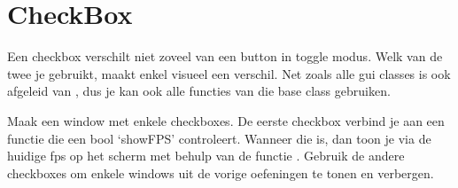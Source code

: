 \chapter{CheckBox}
Een checkbox verschilt niet zoveel van een button in toggle modus. Welk van de twee je gebruikt, maakt enkel visueel een verschil. Net zoals alle gui classes is ook  afgeleid van , dus je kan ook alle functies van die base class gebruiken.

\begin{exercise}
Maak een window met enkele checkboxes. De eerste checkbox verbind je aan een functie die een bool `showFPS' controleert. Wanneer die  is, dan toon je via de huidige fps op het scherm met behulp van de functie . Gebruik de andere checkboxes om enkele windows uit de vorige oefeningen te tonen en verbergen.
\end{exercise}

